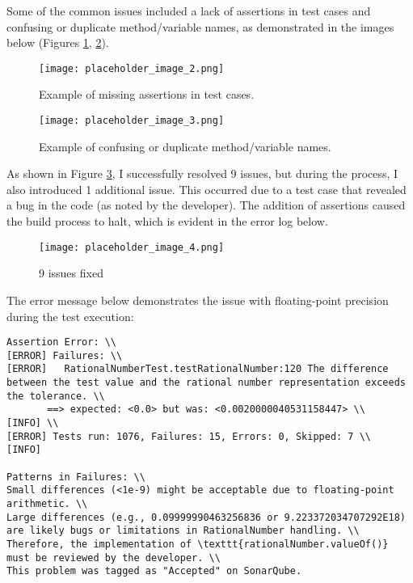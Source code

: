 \documentclass[a4paper,12pt]{report}
\begin{document}
Some of the common issues included a lack of assertions in test cases and confusing or duplicate method/variable names, as demonstrated in the images below (Figures \ref{fig:assertion_issue}, \ref{fig:naming_issue}).

\begin{figure}[H]
    \centering
    \texttt{[image: placeholder\_image\_2.png]} %
    \caption{Example of missing assertions in test cases.}
    \label{fig:assertion_issue}
\end{figure}

\begin{figure}[H]
    \centering
    \texttt{[image: placeholder\_image\_3.png]} %
    \caption{Example of confusing or duplicate method/variable names.}
    \label{fig:naming_issue}
\end{figure}

As shown in Figure \ref{fig:fixed_issues}, I successfully resolved 9 issues, but during the process, I also introduced 1 additional issue. This occurred due to a test case that revealed a bug in the code (as noted by the developer). The addition of assertions caused the build process to halt, which is evident in the error log below.

\begin{figure}[H]
    \centering
    \texttt{[image: placeholder\_image\_4.png]} %
    \caption{9 issues fixed}
    \label{fig:fixed_issues}
\end{figure}

The error message below demonstrates the issue with floating-point precision during the test execution:

\begin{lstlisting}
Assertion Error: \\
[ERROR] Failures: \\
[ERROR]   RationalNumberTest.testRationalNumber:120 The difference between the test value and the rational number representation exceeds the tolerance. \\
       ==> expected: <0.0> but was: <0.0020000040531158447> \\
[INFO] \\
[ERROR] Tests run: 1076, Failures: 15, Errors: 0, Skipped: 7 \\
[INFO] 

Patterns in Failures: \\
Small differences (<1e-9) might be acceptable due to floating-point arithmetic. \\
Large differences (e.g., 0.09999990463256836 or 9.223372034707292E18) are likely bugs or limitations in RationalNumber handling. \\
Therefore, the implementation of \texttt{rationalNumber.valueOf()} must be reviewed by the developer. \\
This problem was tagged as "Accepted" on SonarQube.
\end{lstlisting}
\end{document}
